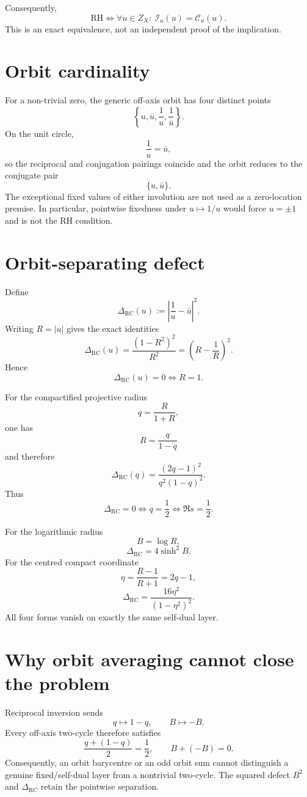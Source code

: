 Consequently,
\[
\boxed{
\mathrm{RH}
\iff
\forall u\in Z_X:\ \mathcal I_u(u)=\mathcal C_u(u).
}
\]
This is an exact equivalence, not an independent proof of the implication.

\section{Orbit cardinality}
For a non-trivial zero, the generic off-axis orbit has four distinct points
\[
\left\{u,\bar u,\frac1u,\frac1{\bar u}\right\}.
\]
On the unit circle,
\[
\frac1u=\bar u,
\]
so the reciprocal and conjugation pairings coincide and the orbit reduces to the conjugate pair
\[
\{u,\bar u\}.
\]
The exceptional fixed values of either involution are not used as a zero-location premise. In particular, pointwise fixedness under $u\mapsto1/u$ would force $u=\pm1$ and is not the RH condition.

\section{Orbit-separating defect}
Define
\[
\boxed{
\Delta_{\mathrm{RC}}(u)
:=\left|\frac1u-\bar u\right|^2.
}
\]
Writing $R=|u|$ gives the exact identities
\[
\Delta_{\mathrm{RC}}(u)
=\frac{(1-R^2)^2}{R^2}
=\left(R-\frac1R\right)^2.
\]
Hence
\[
\boxed{\Delta_{\mathrm{RC}}(u)=0\iff R=1.}
\]

For the compactified projective radius
\[
q=\frac{R}{1+R},
\]
one has
\[
R=\frac{q}{1-q}
\]
and therefore
\[
\boxed{
\Delta_{\mathrm{RC}}(q)
=\frac{(2q-1)^2}{q^2(1-q)^2}.
}
\]
Thus
\[
\Delta_{\mathrm{RC}}=0
\iff q=\frac12
\iff\Re s=\frac12.
\]

For the logarithmic radius
\[
B=\log R,
\]
\[
\boxed{\Delta_{\mathrm{RC}}=4\sinh^2B.}
\]
For the centred compact coordinate
\[
\eta=\frac{R-1}{R+1}=2q-1,
\]
\[
\boxed{
\Delta_{\mathrm{RC}}
=\frac{16\eta^2}{(1-\eta^2)^2}.
}
\]
All four forms vanish on exactly the same self-dual layer.

\section{Why orbit averaging cannot close the problem}
Reciprocal inversion sends
\[
q\mapsto1-q,
\qquad B\mapsto-B.
\]
Every off-axis two-cycle therefore satisfies
\[
\frac{q+(1-q)}2=\frac12,
\qquad B+(-B)=0.
\]
Consequently, an orbit barycentre or an odd orbit sum cannot distinguish a genuine fixed/self-dual layer from a nontrivial two-cycle. The squared defect $B^2$ and $\Delta_{\mathrm{RC}}$ retain the pointwise separation.

